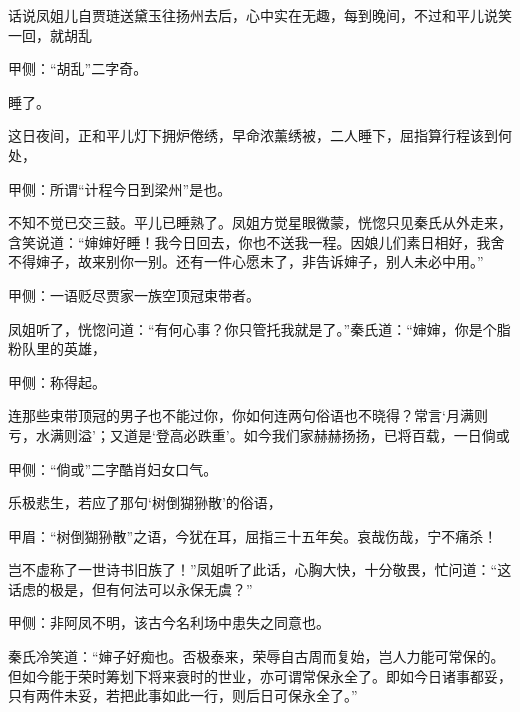 \begin{parag}
    话说凤姐儿自贾琏送黛玉往扬州去后，心中实在无趣，每到晚间，不过和平儿说笑一回，就胡乱\begin{note}甲侧：“胡乱”二字奇。\end{note}睡了。
\end{parag}


\begin{parag}
    这日夜间，正和平儿灯下拥炉倦绣，早命浓薰绣被，二人睡下，屈指算行程该到何处，\begin{note}甲侧：所谓“计程今日到梁州”是也。\end{note}不知不觉已交三鼓。平儿已睡熟了。凤姐方觉星眼微蒙，恍惚只见秦氏从外走来，含笑说道：“婶婶好睡！我今日回去，你也不送我一程。因娘儿们素日相好，我舍不得婶子，故来别你一别。还有一件心愿未了，非告诉婶子，别人未必中用。”\begin{note}甲侧：一语贬尽贾家一族空顶冠束带者。\end{note}
\end{parag}


\begin{parag}
    凤姐听了，恍惚问道：“有何心事？你只管托我就是了。”秦氏道：“婶婶，你是个脂粉队里的英雄，\begin{note}甲侧：称得起。\end{note}连那些束带顶冠的男子也不能过你，你如何连两句俗语也不晓得？常言‘月满则亏，水满则溢’；又道是‘登高必跌重’。如今我们家赫赫扬扬，已将百载，一日倘或\begin{note}甲侧：“倘或”二字酷肖妇女口气。\end{note}乐极悲生，若应了那句‘树倒猢狲散’的俗语，\begin{note}甲眉：“树倒猢狲散”之语，今犹在耳，屈指三十五年矣。哀哉伤哉，宁不痛杀！\end{note}岂不虚称了一世诗书旧族了！”凤姐听了此话，心胸大快，十分敬畏，忙问道：“这话虑的极是，但有何法可以永保无虞？”\begin{note}甲侧：非阿凤不明，该古今名利场中患失之同意也。\end{note}秦氏冷笑道：“婶子好痴也。否极泰来，荣辱自古周而复始，岂人力能可常保的。但如今能于荣时筹划下将来衰时的世业，亦可谓常保永全了。即如今日诸事都妥，只有两件未妥，若把此事如此一行，则后日可保永全了。”
\end{parag}


